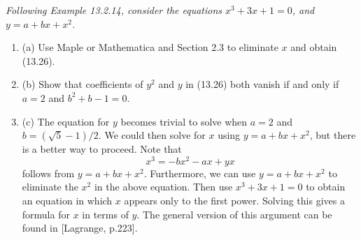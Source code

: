 \documentclass[11pt,a4paper]{article}
\newcommand{\be} {\begin{enumerate}}
\newcommand{\ee} {\end{enumerate}}
\begin{document}
{\it Following Example 13.2.14, consider the equations $x^3+3x+1 = 0$, and $y =a+bx+x^2$.
\be
\item[(a)] Use Maple or Mathematica and Section 2.3 to eliminate $x$ and obtain (13.26).
\item[(b)] Show that coefficients of $y^2$ and $y$ in (13.26) both vanish if and only if $a=2$ and $b^2+b-1 = 0$.
\item[(c)] The equation for $y$ becomes trivial to solve when $a = 2$ and $b = (\sqrt{5} - 1)/2$. We could then solve for $x$ using $y = a+b x+x^2$, but there is a better way to proceed. Note that
$$x^3 = -bx^2 -ax + yx$$
follows from $y = a+bx+x^2$. Furthermore, we can use $y =a +bx+x^2$ to eliminate the $x^2$ in the above equation. Then use $x^3+3x+1 = 0$ to obtain an equation in which $x$ appears only to the first power. Solving this gives a formula for $x$ in terms of $y$. The general version of this argument can be found in [Lagrange, p.223].
\ee
}
\end{document}
